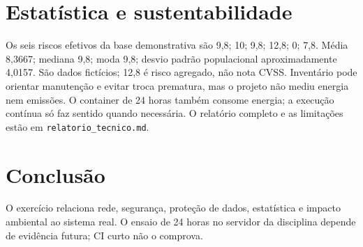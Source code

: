 \documentclass[12pt]{article}
\begin{document}
\section*{Estatística e sustentabilidade}
Os seis riscos efetivos da base demonstrativa são 9,8; 10; 9,8; 12,8; 0; 7,8. Média 8,3667; mediana 9,8; moda 9,8; desvio padrão populacional aproximadamente 4,0157. São dados fictícios; 12,8 é risco agregado, não nota CVSS. Inventário pode orientar manutenção e evitar troca prematura, mas o projeto não mediu energia nem emissões. O container de 24 horas também consome energia; a execução contínua só faz sentido quando necessária. O relatório completo e as limitações estão em \texttt{relatorio\_tecnico.md}.
\section*{Conclusão}
O exercício relaciona rede, segurança, proteção de dados, estatística e impacto ambiental ao sistema real. O ensaio de 24 horas no servidor da disciplina depende de evidência futura; CI curto não o comprova.
\end{document}
